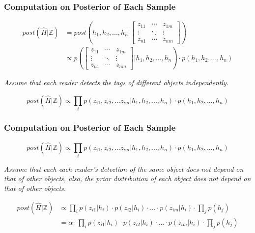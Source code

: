 
\begin{frame}
\frametitle{Computation on Posterior of Each Sample}

\begin{equation*}
  \begin{split}
  post(\hat{H}|\mathbb{Z}) & = post(h_1, h_2, ..., h_n | \begin{bmatrix}
 z_{11} & \cdots & z_{1m} \\
 \vdots & \ddots & \vdots \\
 z_{n1} & \cdots & z_{nm}
\end{bmatrix}) \\
 & \propto p(\begin{bmatrix}
z_{11} & \cdots & z_{1m} \\
\vdots & \ddots & \vdots \\
z_{n1} & \cdots & z_{nm}
\end{bmatrix} | h_1, h_2, ..., h_n) \cdot p(h_1, h_2, ..., h_n)
  \end{split}
\end{equation*}
\pause

\emph{Assume that each reader detects the tags of different objects independently.} \pause

\begin{equation*}
  post(\hat{H}|\mathbb{Z}) \propto \prod_{i}p(z_{i1},z_{i2},...z_{im} | h_1, h_2, ..., h_n) \cdot p(h_1, h_2, ..., h_n)
\end{equation*}


\end{frame}


\begin{frame}
\frametitle{Computation on Posterior of Each Sample}

\begin{equation*}
  post(\hat{H}|\mathbb{Z}) \propto \prod_{i}p(z_{i1},z_{i2},...z_{im} | h_1, h_2, ..., h_n) \cdot p(h_1, h_2, ..., h_n)
\end{equation*}
\pause

\emph{Assume that each each reader's detection of the same object does not depend on that of other objects, also, the prior distribution of each object does not depend on that of other objects.} \pause

\begin{equation*}
  \begin{split}
  post(\hat{H}|\mathbb{Z}) & \propto \prod_{i} p(z_{i1} | h_i) \cdot p(z_{i2} | h_i) \cdot ... \cdot p(z_{im} | h_i) \cdot \prod_{j} p(h_j) \\
  & = \alpha \cdot \prod_{i} p(z_{i1} | h_i) \cdot p(z_{i2} | h_i) \cdot ... \cdot p(z_{im} | h_i) \cdot \prod_{j} p(h_j)
  \end{split}
\end{equation*}
\pause

\end{frame}

